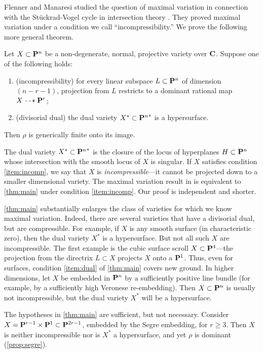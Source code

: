 \documentclass[11pt,reqno]{amsart}
\theoremstyle{plain}
\theoremstyle{definition}
\theoremstyle{remark}
\numberwithin{equation}{section}
\numberwithin{equation}{section}
\begin{document}
Flenner and Manaresi  studied the question of maximal variation
in connection with the St\"uckrad-Vogel cycle in intersection theory \cite{fle.man:98}. 
They proved maximal variation under a condition we call ``incompressibility.''
We prove the following more general theorem.
\begin{maintheorem}\label{thm:main}
  Let $X \subset \P^n$ be a non-degenerate, normal, projective variety over $\C$.
  Suppose one of the following holds:
  \begin{enumerate}
  \item\label{item:incomp}(incompressibility) for every linear subspace $L \subset \P^n$ of dimension $(n-r-1)$, projection from $L$ restricts to a dominant rational map $X \dashrightarrow \P^r$;
  \item\label{item:dual}(divisorial dual) the dual variety $X^* \subset {\P^n}^*$ is a hypersurface.
  \end{enumerate}
  Then $\rho$ is generically finite onto its image.
\end{maintheorem}

The dual variety $X^* \subset {\P^n}^*$ is the closure of the locus of hyperplanes $H \subset \P^n$ whose intersection with the smooth locus of $X$ is singular.
If $X$ satisfies condition \eqref{item:incomp}, we say that $X$ is \emph{incompressible}---it cannot be projected down to a smaller dimensional variety.
The maximal variation result in \cite{fle.man:98} is equivalent to \autoref{thm:main} under condition \eqref{item:incomp}.
Our proof is independent and shorter.

\autoref{thm:main} substantially enlarges the class of varieties for which we know maximal variation.
Indeed, there are several varieties that have a divisorial dual, but are compressible.
For example, if $X$ is any smooth surface (in characteristic zero), then the dual variety $X^*$ is a hypersurface.
But not all such $X$ are incompressible.
The first example is the cubic surface scroll $X \subset \P^4$---the projection from the directrix $L \subset X$ projects $X$ onto a $\P^1$.
Thus, even for surfaces, condition \eqref{item:dual} of \autoref{thm:main} covers new ground.
In higher dimensions, let $X$ be embedded in $\P^n$ by a sufficiently positive line bundle (for example, by a sufficiently high Veronese re-embedding).
Then $X \subset \P^n$ is usually not incompressible, but the dual variety $X^*$ will be a hypersurface.

The hypotheses in \autoref{thm:main} are sufficient, but not necessary.
Consider $X = \P^{r-1} \times \P^1 \subset \P^{2r-1}$, embedded by the Segre embedding, for $r \geq 3$.
Then $X$ is neither incompressible nor is $X^*$ a hypersurface, and yet $\rho$ is dominant (\autoref{prop:segre}).
\end{document}
